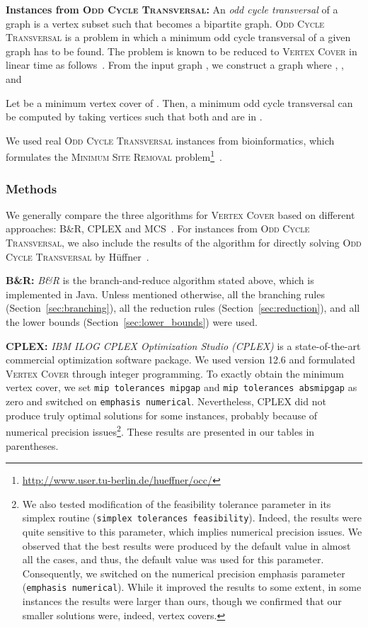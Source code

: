 \documentclass[11pt]{article}
\newcommand{\OCT}{\textsc{Odd Cycle Transversal}\xspace}
\newcommand{\myparagraph}[1]{\vspace{1em}\noindent\textbf{#1:}}
\begin{document}
\myparagraph{Instances from \OCT}
An \emph{odd cycle transversal} of a graph  is a vertex subset  such that  becomes a bipartite
graph.
\textsc{Odd Cycle Transversal} is a problem in which a minimum odd cycle transversal of a given graph has to be found.
The problem is known to be reduced to \textsc{Vertex Cover} in linear time as
follows~\cite{DBLP:journals/corr/abs-1203-0833}.
From the input graph , we construct a graph  where
, , and

Let  be a minimum vertex cover of .
Then, a minimum odd cycle transversal can be computed by taking vertices  such that both  and
 are in .

We used real \textsc{Odd Cycle Transversal} instances from bioinformatics,
which formulates the \textsc{Minimum Site Removal} problem\footnote{\url{http://www.user.tu-berlin.de/hueffner/occ/}}~\cite{oct/huffner09}.




\subsubsection{Methods}
We generally compare the three algorithms for \textsc{Vertex Cover} based on different approaches:
B\&R, CPLEX and MCS~\cite{clique/mcs_walcom10}.
For instances from \OCT, we also include the results of the algorithm for directly solving \OCT
by H{\"u}ffner~\cite{oct/huffner09}.

\myparagraph{B\&R} \emph{B\&R} is the branch-and-reduce algorithm stated above, which is implemented in Java.
Unless mentioned otherwise,
all the branching rules (Section~\ref{sec:branching}),
all the reduction rules (Section~\ref{sec:reduction}),
and all the lower bounds (Section~\ref{sec:lower_bounds})
were used.

\myparagraph{CPLEX} \emph{IBM ILOG CPLEX Optimization Studio (CPLEX)} is a state-of-the-art commercial optimization software package.
We used version 12.6 and formulated \textsc{Vertex Cover} through integer programming.
To exactly obtain the minimum vertex cover,
we set \texttt{mip tolerances mipgap} and \texttt{mip tolerances absmipgap} as zero
and switched on \texttt{emphasis numerical}.
Nevertheless, CPLEX did not produce truly optimal solutions for some instances,
probably because of numerical precision issues\footnote{We also tested modification of the feasibility tolerance parameter in its simplex routine
(\texttt{simplex tolerances feasibility}).
Indeed, the results were quite sensitive to this parameter,
which implies numerical precision issues.
We observed that the best results were produced
by the default value  in almost all the cases,
and thus, the default value was used for this parameter.
Consequently, we switched on the numerical precision emphasis parameter (\texttt{emphasis numerical}).
While it improved the results to some extent,
in some instances the results were larger than ours,
though we confirmed that our smaller solutions were, indeed, vertex covers.}.
These results are presented in our tables in parentheses.
\end{document}
